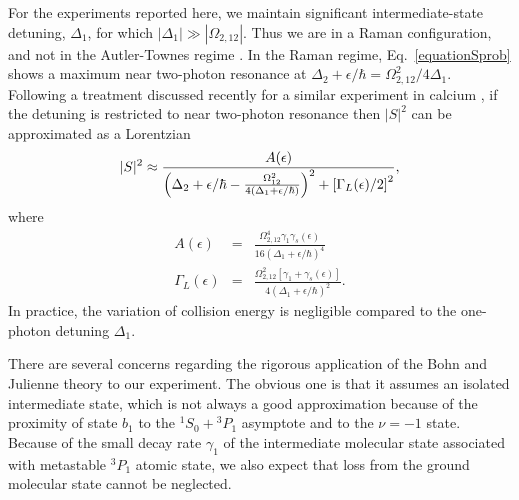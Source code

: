 For the experiments reported here, we maintain significant intermediate-state detuning, $\Delta_1$, for which $|\Delta_1|\gg |\Omega_{2,12}|$. Thus we are in a Raman configuration, and not in the Autler-Townes regime \cite{mmp08}.  In the Raman regime, Eq.\ \ref{equationSprob} shows a maximum near two-photon resonance at $\Delta_2+\epsilon/\hbar =\Omega_{2,12}^2/4\Delta_1$. Following a treatment discussed recently for a similar experiment in calcium \cite{pdt17}, if the detuning is restricted to near two-photon resonance then $\vert S\vert^2$ can be approximated as a Lorentzian
\begin{eqnarray}\label{equationSprobLorentzian}
 \vert S\vert^2 \approx {A(\epsilon) \over
 \left(\Delta_2+\epsilon/\hbar-\frac{\Omega_{12}^{2}}{4(\Delta_1+\epsilon/\hbar)}\right)^2+\left[ {\Gamma_L(\epsilon)}/{2}\right]^2},
\end{eqnarray}
where 
\begin{eqnarray}\label{ApproxLorentzianQuantitiesMain}
  A(\epsilon)&=& \frac{\Omega_{2,12}^{4}\gamma_1 \gamma_s(\epsilon)}{16(\Delta_1+\epsilon/\hbar)^4} \\
  \label{ApproxLorentzianQuantities-2Main}
  \Gamma_L(\epsilon)&=& \frac{\Omega_{2,12}^{2}[\gamma_1 +\gamma_s(\epsilon)]}{4(\Delta_1+\epsilon/\hbar)^2}.
\end{eqnarray}
In practice, the variation of collision energy is negligible compared to the one-photon detuning $\Delta_1$. 







There are several concerns regarding the rigorous application of the Bohn and Julienne theory \cite{bju96}  to our experiment. The obvious one is that it assumes an isolated intermediate state, which is not always a good approximation because of the proximity of state $b_1$ to the $^1S_0+{^3P_1}$ asymptote and to the $\nu=-1$ state. Because of the small decay rate $\gamma_1$ of the intermediate molecular state associated with metastable $^3 P_1$ atomic state, we also expect that loss from the ground molecular state cannot be neglected.



